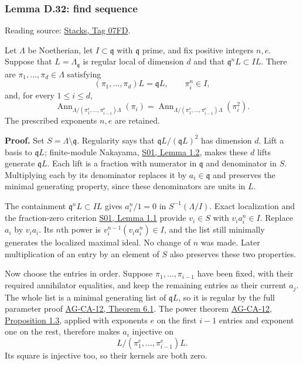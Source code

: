 \documentclass[11pt,a4paper,openany]{report}
\begin{document}
\label{AG-RG-S05-smoothing-lemma-find-sequence}

\subsubsection{Lemma D.32: find sequence}\label{AG-RG-S05-lemma-d.32-find-sequence}

Reading source: \href{https://stacks.math.columbia.edu/tag/07FD}{Stacks, Tag 07FD}.

Let \(\Lambda\) be Noetherian, let \(I\subset\mathfrak q\) with \(\mathfrak q\) prime, and fix positive integers \(n,e\). Suppose that \(L=\Lambda_{\mathfrak q}\) is regular local of dimension \(d\) and that \(\mathfrak q^nL\subset IL\). There are \(\pi_1,\ldots,\pi_d\in\Lambda\) satisfying \[
(\pi_1,\ldots,\pi_d)L=\mathfrak qL,
\qquad \pi_i^n\in I,
\] and, for every \(1\le i\le d\), \[
\operatorname{Ann}_{\Lambda/(\pi_1^e,\ldots,\pi_{i-1}^e)\Lambda}(\pi_i)
=\operatorname{Ann}_{\Lambda/(\pi_1^e,\ldots,\pi_{i-1}^e)\Lambda}(\pi_i^2).
\] The prescribed exponents \(n,e\) are retained.

\textbf{Proof.} Set \(S=\Lambda\setminus\mathfrak q\). Regularity says that \(\mathfrak qL/(\mathfrak qL)^2\) has dimension \(d\). Lift a basis to \(\mathfrak qL\); finite-module Nakayama, \href{https://github.com/KokunoYumeto/open-math-courses/blob/main/docs/courses/AG-RG/AG-RG-S01.md}{S01, Lemma 1.2}, makes these \(d\) lifts generate \(\mathfrak qL\). Each lift is a fraction with numerator in \(\mathfrak q\) and denominator in \(S\). Multiplying each by its denominator replaces it by \(a_i\in\mathfrak q\) and preserves the minimal generating property, since these denominators are units in \(L\).

The containment \(\mathfrak q^nL\subset IL\) gives \(a_i^n/1=0\) in \(S^{-1}(\Lambda/I)\). Exact localization and the fraction-zero criterion \href{https://github.com/KokunoYumeto/open-math-courses/blob/main/docs/courses/AG-RG/AG-RG-S01.md}{S01, Lemma 1.1} provide \(v_i\in S\) with \(v_i a_i^n\in I\). Replace \(a_i\) by \(v_i a_i\). Its \(n\)th power is \(v_i^{n-1}(v_i a_i^n)\in I\), and the list still minimally generates the localized maximal ideal. No change of \(n\) was made. Later multiplication of an entry by an element of \(S\) also preserves these two properties.

Now choose the entries in order. Suppose \(\pi_1,\ldots,\pi_{i-1}\) have been fixed, with their required annihilator equalities, and keep the remaining entries as their current \(a_j\). The whole list is a minimal generating list of \(\mathfrak qL\), so it is regular by the full parameter proof \href{https://github.com/KokunoYumeto/open-math-courses/blob/d02d0a3669f42579db037cd44de1d113fdd770a1/docs/courses/AG-CA/src/regular-sequences-depth-and-cohen-macaulay-modules.md}{AG-CA-12, Theorem 6.1}. The power theorem \href{https://github.com/KokunoYumeto/open-math-courses/blob/d02d0a3669f42579db037cd44de1d113fdd770a1/docs/courses/AG-CA/src/regular-sequences-depth-and-cohen-macaulay-modules.md}{AG-CA-12, Proposition 1.3}, applied with exponents \(e\) on the first \(i-1\) entries and exponent one on the rest, therefore makes \(a_i\) injective on \[
L/(\pi_1^e,\ldots,\pi_{i-1}^e)L.
\] Its square is injective too, so their kernels are both zero.
\end{document}
